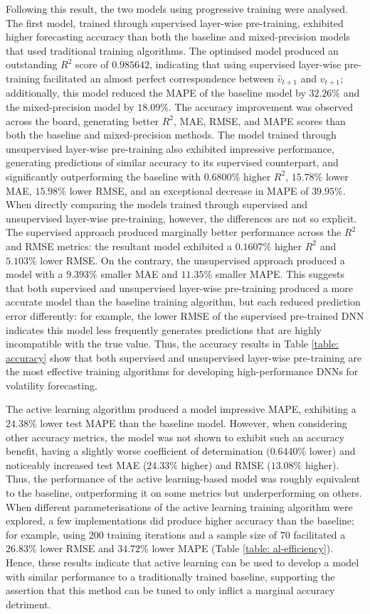 \documentclass[a4paper, 11pt]{report}
\begin{document}
    Following this result, the two models using progressive training were analysed. The first model, trained through supervised layer-wise pre-training, exhibited higher forecasting accuracy than both the baseline and mixed-precision models that used traditional training algorithms. The optimised model produced an outstanding $R^2$ score of $0.985642$, indicating that using supervised layer-wise pre-training facilitated an almost perfect correspondence between $\hat{v}_{t+1}$ and $v_{t+1}$; additionally, this model reduced the MAPE of the baseline model by $32.26\%$ and the mixed-precision model by $18.09\%$. The accuracy improvement was observed across the board, generating better $R^2$, MAE, RMSE, and MAPE scores than both the baseline and mixed-precision methods. The model trained through unsupervised layer-wise pre-training also exhibited impressive performance, generating predictions of similar accuracy to its supervised counterpart, and significantly outperforming the baseline with $0.6800\%$ higher $R^2$, $15.78\%$ lower MAE, $15.98\%$ lower RMSE, and an exceptional decrease in MAPE of $39.95\%$. When directly comparing the models trained through supervised and unsupervised layer-wise pre-training, however, the differences are not so explicit. The supervised approach produced marginally better performance across the $R^2$ and RMSE metrics: the resultant model exhibited a $0.1607\%$ higher $R^2$ and $5.103\%$ lower RMSE. On the contrary, the unsupervised approach produced a model with a $9.393\%$ smaller MAE and $11.35\%$ smaller MAPE. This suggests that both supervised and unsupervised layer-wise pre-training produced a more accurate model than the baseline training algorithm, but each reduced prediction error differently: for example, the lower RMSE of the supervised pre-trained DNN indicates this model less frequently generates predictions that are highly incompatible with the true value. Thus, the accuracy results in Table \ref{table: accuracy} show that both supervised and unsupervised layer-wise pre-training are the most effective training algorithms for developing high-performance DNNs for volatility forecasting. 

    The active learning algorithm produced a model impressive MAPE, exhibiting a $24.38\%$ lower test MAPE than the baseline model. However, when considering other accuracy metrics, the model was not shown to exhibit such an accuracy benefit, having a slightly worse coefficient of determination ($0.6440\%$ lower) and noticeably increased test MAE ($24.33\%$ higher) and RMSE ($13.08\%$ higher). Thus, the performance of the active learning-based model was roughly equivalent to the baseline, outperforming it on some metrics but underperforming on others. When different parameterisations of the active learning training algorithm were explored, a few implementations did produce higher accuracy than the baseline; for example, using $200$ training iterations and a sample size of $70$ facilitated a $26.83\%$ lower RMSE and $34.72\%$ lower MAPE (Table \ref{table: al-efficiency}). Hence, these results indicate that active learning can be used to develop a model with similar performance to a traditionally trained baseline, supporting the assertion that this method can be tuned to only inflict a marginal accuracy detriment.
\end{document}
